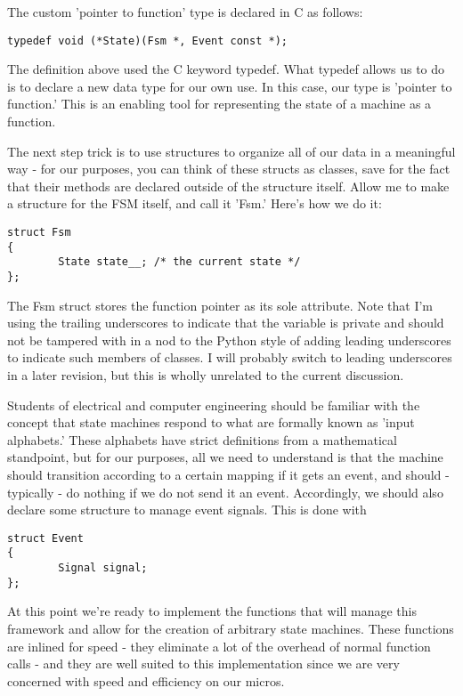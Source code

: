 The custom 'pointer to function' type is declared in C as follows:
\begin{lstlisting}
typedef void (*State)(Fsm *, Event const *);
\end{lstlisting}

The definition above used the C keyword typedef. What typedef allows us to do is to declare a new data type for our own use. In this case, our type is 'pointer to function.' This is an enabling tool for representing the state of a machine as a function.

The next step trick is to use structures to organize all of our data in a meaningful way - for our purposes, you can think of these structs as classes, save for the fact that their methods are declared outside of the structure itself. Allow me to make a structure for the FSM itself, and call it 'Fsm.' Here's how we do it:

\begin{lstlisting}
struct Fsm
{      
        State state__; /* the current state */
};
\end{lstlisting}

The Fsm struct stores the function pointer as its sole attribute. Note that I'm using the trailing underscores to indicate that the variable is private and should not be tampered with in a nod to the Python style of adding leading underscores to indicate such members of classes. I will probably switch to leading underscores in a later revision, but this is wholly unrelated to the current discussion.

Students of electrical and computer engineering should be familiar with the concept that state machines respond to what are formally known as 'input alphabets.' These alphabets have strict definitions from a mathematical standpoint, but for our purposes, all we need to understand is that the machine should transition according to a certain mapping if it gets an event, and should - typically - do nothing if we do not send it an event. Accordingly, we should also declare some structure to manage event signals. This is done with

\begin{lstlisting}
struct Event
{
        Signal signal;
};
\end{lstlisting}

At this point we're ready to implement the functions that will manage this framework and allow for the creation of arbitrary state machines. These functions are inlined for speed - they eliminate a lot of the overhead of normal function calls - and they are well suited to this implementation since we are very concerned with speed and efficiency on our micros.

